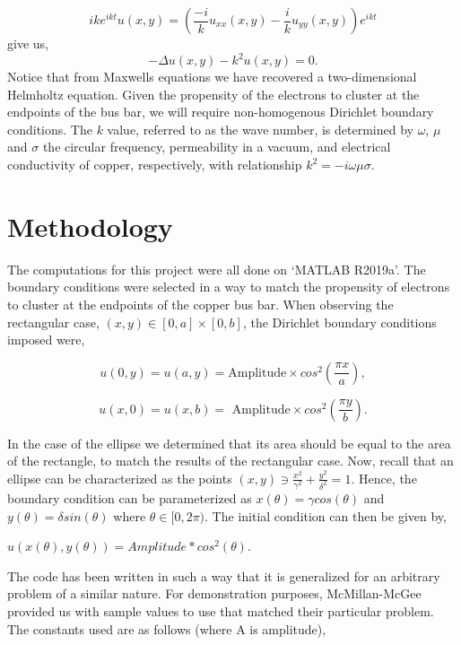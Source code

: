 \documentclass[11pt]{article}
\begin{document}
\[
ike^{ikt}u(x,y) = (\frac{-i}{k}u_{xx}(x,y)-\frac{i}{k}u_{yy}(x,y))e^{ikt} 
\]
give us,
\[-\Delta u(x,y)-k^{2}u(x,y)=0.\]
Notice that from Maxwells equations we have recovered a two-dimensional Helmholtz
equation. Given the propensity of the electrons to cluster at the
endpoints of the bus bar, we will require non-homogenous Dirichlet
boundary conditions. The $k$ value, referred to as the wave number,
 is determined by $ \omega $, $
\mu $ and $ \sigma $ the circular frequency, permeability in a
vacuum, and electrical conductivity of copper, respectively, with
relationship $k^{2}=-i \omega \mu \sigma$.

\section{Methodology}

The computations for this project were all done on `MATLAB R2019a'. The
boundary conditions were selected in a way to match the propensity of
electrons to cluster at the endpoints of the copper bus bar. When
observing the rectangular case, $(x,y) \in [0,a]\times [0,b] $, 
the Dirichlet boundary conditions imposed were,

\[ u(0,y) = u(a,y) = \text{Amplitude} \times cos^{2}(\frac{\pi x}{a}), \]

\[ u(x,0) = u(x,b) =\text{ Amplitude}\times cos^{2}(\frac{\pi y}{b}). \]

In the case of the ellipse we determined that its area should be equal to the area of the rectangle, to match the results of the rectangular case. Now, recall that an ellipse can be characterized as the points $ (x,y) \ni \frac{x^{2}}{\gamma^{2}} +
\frac{y^{2}}{\delta^{2}} = 1 $. Hence, the boundary condition
can be parameterized as $x(\theta) = \gamma cos(\theta)$ and $y(\theta) = \delta sin(\theta)$
where $\theta \in [0, 2\pi )$. The initial condition can then be given by,

$ u(x(\theta),y(\theta)) = Amplitude*cos^{2}(\theta). $

\newpage

The code has been written in such a way that it is generalized for an
arbitrary problem of a similar nature. For demonstration purposes,
McMillan-McGee provided us with sample values to use that matched their
particular problem. The constants used are as follows (where A is amplitude),
\end{document}
